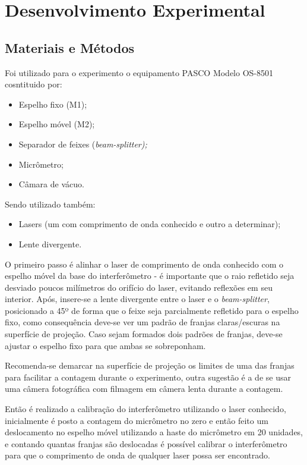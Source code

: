 \section{Desenvolvimento Experimental}
\subsection{Materiais e Métodos}
Foi utilizado para o experimento o equipamento PASCO Modelo OS-8501 cosntituido por: 
\begin{itemize}
	\item Espelho fixo (M1);
	\item Espelho móvel (M2);
	\item Separador de feixes (\it{beam-splitter});
	\item Micrômetro;
	\item Câmara de vácuo.
\end{itemize}
Sendo utilizado também:
\begin{itemize}
	\item Lasers (um com comprimento de onda conhecido e outro a determinar);
	\item Lente divergente.
\end{itemize}

    O primeiro passo é alinhar o laser de comprimento de onda conhecido com o espelho móvel da base do interferômetro - é importante que o raio refletido seja desviado poucos milímetros do orifício do laser, evitando reflexões em seu interior. Após, insere-se a lente divergente entre o laser e o {\it beam-splitter}, posicionado a 45º de forma que o feixe seja parcialmente refletido para o espelho fixo, como consequência deve-se ver um padrão de franjas claras/escuras na superfície de projeção. Caso sejam formados dois padrões de franjas, deve-se ajustar o espelho fixo para que ambas se sobreponham. 

    Recomenda-se demarcar na superfície de projeção os limites de uma das franjas para facilitar a contagem durante o experimento, outra sugestão é a de se usar uma câmera fotográfica com filmagem em câmera lenta durante a contagem. 
    
Então é realizado a calibração do interferômetro utilizando o laser conhecido, inicialmente é posto a contagem do micrômetro no zero e então feito um deslocamento no espelho móvel utilizando a haste do micrômetro em 20 unidades, e contando quantas franjas são deslocadas é possível calibrar o interferômetro para que o comprimento de onda de qualquer laser possa ser encontrado.

